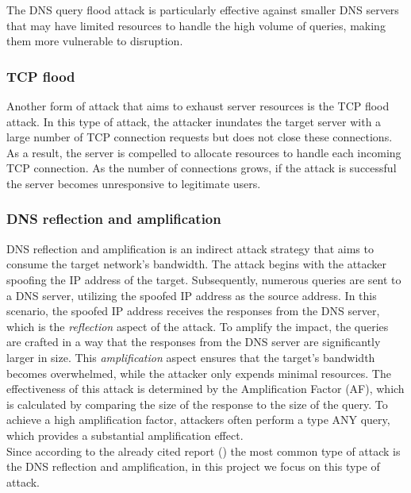 The DNS query flood attack is particularly effective against smaller DNS servers that may have limited resources to handle 
the high volume of queries, making them more vulnerable to disruption.

\subsubsection*{TCP flood}
Another form of attack that aims to exhaust server resources is the TCP flood attack. In this type of attack, the attacker inundates the 
target server with a large number of TCP connection requests but does not close these connections. As a result, the server is compelled 
to allocate resources to handle each incoming TCP connection. As the number of connections grows, if the attack is successful the server 
becomes unresponsive to legitimate users.

\subsubsection*{DNS reflection and amplification}
DNS reflection and amplification is an indirect attack strategy that aims to consume the target network's bandwidth. The attack 
begins with the attacker spoofing the IP address of the target. Subsequently, numerous queries are sent to a DNS server, utilizing the 
spoofed IP address as the source address. In this scenario, the spoofed IP address receives the responses from the DNS server, which 
is the \textit{reflection} aspect of the attack.
To amplify the impact, the queries are crafted in a way that the responses from the DNS server are significantly larger 
in size. This \textit{amplification} aspect ensures that the target's bandwidth becomes overwhelmed, while the attacker only expends minimal resources.
The effectiveness of this attack is determined by the Amplification Factor (AF), which is calculated by comparing the size of the response to 
the size of the query. To achieve a high amplification factor, attackers often perform a type ANY query, which provides a 
substantial amplification effect.
\\
Since according to the already cited report (\cite{DDoSthreatreport}) the most common type of attack is the DNS reflection and amplification,
in this project we focus on this type of attack.


